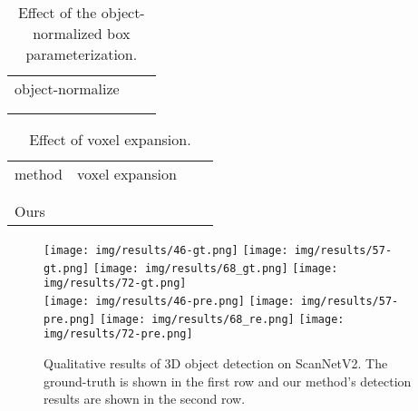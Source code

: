 \documentclass[10pt,twocolumn,letterpaper]{article}
\newcommand{\cmark}{\ding{51}}\newcommand{\xmark}{\ding{55}}
\begin{document}
\begin{table}[t]
\footnotesize
\renewcommand{\arraystretch}{1.2}
\centering
\begin{minipage}{1\linewidth}
{\begin{center}
\resizebox{1.0\linewidth}{!}
{
\begin{tabular}{c|cc}
  object-normalize  &  &  \\
    \shline
  \xmark &&  \\ 
  \rowcolor{gray!10}\cmark &  &  \\ 
\end{tabular}
}
\end{center}}
\end{minipage}
\caption{\small Effect of the object-normalized box parameterization.}
\label{tab:effect_reparam}
\end{table}


\begin{table}[t]
\begin{minipage}[t]{1\linewidth}
\vspace{2mm}
\centering
\setlength{\tabcolsep}{15pt}
\footnotesize
\renewcommand{\arraystretch}{1.2}
\resizebox{1.0\linewidth}{!}
{
\begin{tabular}{l|c|cc}
method & voxel expansion  & &  \\
\shline
\multirow{2}{*}{FCAF3D} & \xmark &  &          \\
& \cmark &  &  \\ \hline
\multirow{2}{*}{Ours} & \cellcolor{gray!10}\xmark & \cellcolor{gray!10} & \cellcolor{gray!10}         \\
& \cmark &  &         \\
\end{tabular}
}
\caption{\small{{
Effect of voxel expansion.}}
}
\label{tab:voxel_expan}
\end{minipage}
\end{table}


\begin{figure*}[t]
\centering
\texttt{[image: img/results/46-gt.png]}
\hfill
\texttt{[image: img/results/57-gt.png]}
\hfill
\texttt{[image: img/results/68\_gt.png]}
\hfill
\texttt{[image: img/results/72-gt.png]} \\
\texttt{[image: img/results/46-pre.png]}
\hfill
\texttt{[image: img/results/57-pre.png]}
\hfill
\texttt{[image: img/results/68\_re.png]}
\hfill
\texttt{[image: img/results/72-pre.png]}

\caption{\small{
Qualitative results of 3D object detection on ScanNetV2. The ground-truth is shown in the first row and our method's detection results are shown in the second row.
}}
\label{fig:qualitative}
\end{figure*}
\end{document}
